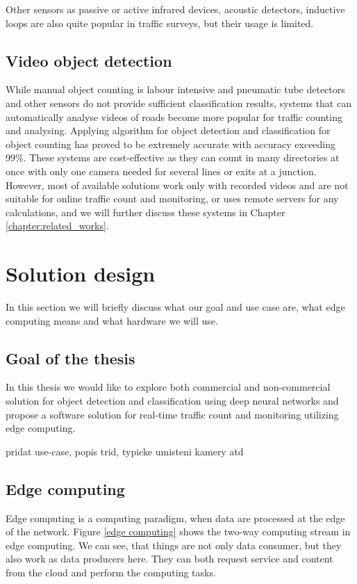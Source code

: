 \documentclass[twoside]{ctuthesis}
\theoremstyle{plain}
\theoremstyle{definition}
\theoremstyle{note}
\begin{document}
 Other sensors as passive or active infrared devices, acoustic detectors, inductive loops are also quite popular in traffic surveys, but their usage is limited.
 
\subsection{Video object detection}
While manual object counting is labour intensive and pneumatic tube detectors and other sensors do not provide sufficient classification results, systems that can automatically analyse videos of roads become more popular for traffic counting and analysing. Applying algorithm for object detection and classification for object counting has proved to be extremely accurate with accuracy exceeding 99\%\cite{liu_zeng_jiang_2017}.
These systems are cost-effective as they can count in many directories at once with only one camera needed for several lines or exits at a junction.  However, most of available solutions work only with recorded videos and are not suitable for online traffic count and monitoring, or uses remote servers for any calculations, and we will further discuss these systems in Chapter \ref{chapter:related_works}.


\section{Solution design}

In this section we will briefly discuss what our goal and use case are, what edge computing means and what hardware we will use.

\subsection{Goal of the thesis}
In this thesis we would like to explore both commercial and non-commercial solution for object detection and classification using deep neural networks and propose a software solution for real-time traffic count and monitoring utilizing edge computing. 


pridat use-case, popis trid, typicke umisteni kamery atd
\subsection{Edge computing}
Edge computing is a computing paradigm, when data are processed at the edge of the network. Figure \ref{edge computing} shows the two-way computing stream in edge computing. We can see, that things are not only data consumer, but they also work as data producers here. They can both request service and content from the cloud and perform the computing tasks. 
\end{document}
